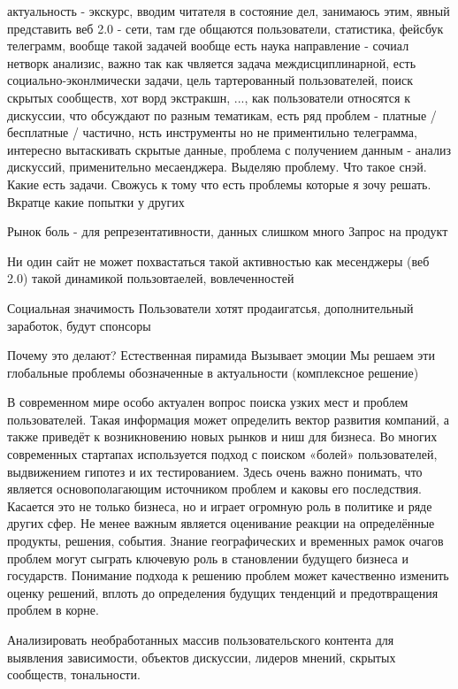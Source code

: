 \documentclass[a4paper,article,14pt]{extarticle}
\begin{document}
актуальность - экскурс, вводим читателя в состояние дел, занимаюсь этим, явный представить веб 2.0 - сети, там где общаются пользователи, статистика, фейсбук телеграмм, вообще такой задачей вообще есть наука направление - сочиал нетворк анализис, важно так как чвляется задача междисциплинарной, есть социально-эконлмически задачи, цель тартерованный пользователей, поиск скрытых сообществ, хот ворд экстракшн, ..., как пользователи относятся к дискуссии, что обсуждают по разным тематикам, есть ряд проблем - платные / бесплатные / частично, нсть инструменты но не приментильно телеграмма, интересно вытаскивать скрытые данные, проблема с получением данным - анализ дискуссий, применительно месаенджера. Выделяю проблему. Что такое снэй. Какие есть задачи. Свожусь к тому что есть проблемы которые я зочу решать. Вкратце какие попытки у других

Рынок
боль - для репрезентативности, данных слишком много
Запрос на продукт

Ни один сайт не может похвастаться такой активностью как месенджеры (веб 2.0) такой динамикой пользовтаелей, вовлеченностей

Социальная значимость
Пользователи хотят продаигатсья, дополнительный заработок, будут спонсоры

Почему это делают?
Естественная пирамида
Вызывает эмоции
Мы решаем эти глобальные проблемы обозначенные в актуальности (комплексное решение)




В современном мире особо актуален вопрос поиска узких мест и проблем пользователей. Такая информация может определить вектор развития компаний, а также приведёт к возникновению новых рынков и ниш для бизнеса. Во многих современных стартапах используется подход с поиском «болей» пользователей, выдвижением гипотез и их тестированием. Здесь очень важно понимать, что является основополагающим источником проблем и каковы его последствия. Касается это не только бизнеса, но и играет огромную роль в политике и ряде других сфер.  Не менее важным является оценивание реакции на определённые продукты, решения, события. Знание географических и временных рамок очагов проблем могут сыграть ключевую роль в становлении будущего бизнеса и государств. Понимание подхода к решению проблем может качественно изменить оценку решений, вплоть до определения будущих тенденций и предотвращения проблем в корне.


Анализировать необработанных массив пользовательского контента для выявления зависимости, объектов дискуссии, лидеров мнений, скрытых сообществ, тональности.
\end{document}
